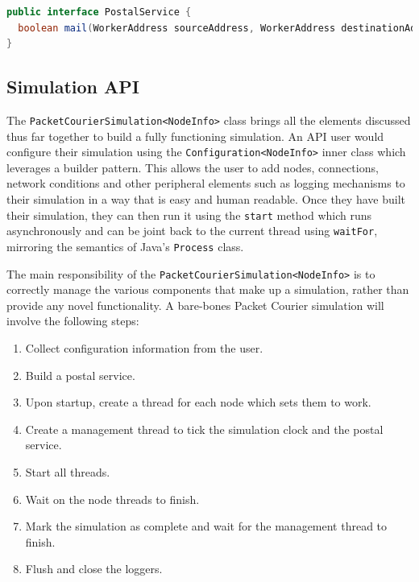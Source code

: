 \begin{lstlisting}[language=Java,caption={The \texttt{PostalService} interface exactly as it appears in the
codebase.},label={code:postal_service_interface},captionpos=b]
public interface PostalService {
  boolean mail(WorkerAddress sourceAddress, WorkerAddress destinationAddress, Packet packet);
}
\end{lstlisting}

\subsection{Simulation API}

The \texttt{PacketCourierSimulation<NodeInfo>} class brings all the elements discussed thus far together to build a
fully functioning simulation. An API user would configure their simulation using the \texttt{Configuration<NodeInfo>}
inner class which leverages a builder pattern\cite{builder_pattern}. This allows the user to add nodes, connections,
network conditions and other peripheral elements such as logging mechanisms to their simulation in a way that is easy
and human readable. Once they have built their simulation, they can then run it using the \texttt{start} method which
runs asynchronously and can be joint back to the current thread using \texttt{waitFor}, mirroring the semantics of
Java's \texttt{Process} class\cite{java_Process}.

The main responsibility of the \texttt{PacketCourierSimulation<NodeInfo>} is to correctly manage the various
components that make up a simulation, rather than provide any novel functionality. A bare-bones Packet Courier
simulation will involve the following steps:
\begin{enumerate}
    \item Collect configuration information from the user.
    \item Build a postal service.
    \item Upon startup, create a thread for each node which sets them to work.
    \item Create a management thread to tick the simulation clock and the postal service.
    \item Start all threads.
    \item Wait on the node threads to finish.
    \item Mark the simulation as complete and wait for the management thread to finish.
    \item Flush and close the loggers.
\end{enumerate}

